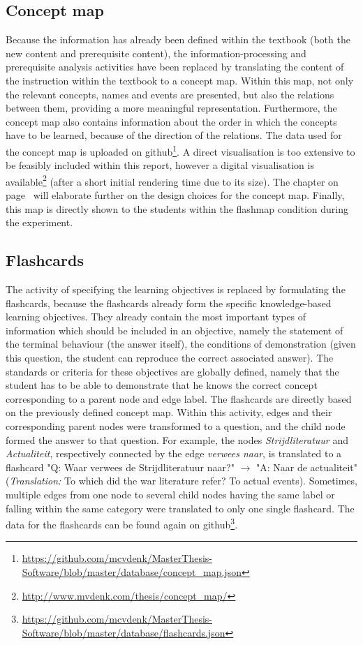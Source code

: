 \subsection{Concept map}

Because the information has already been defined within the textbook (both the new content and prerequisite content), the information-processing and prerequisite analysis activities have been replaced by translating the content of the instruction within the textbook to a concept map. Within this map, not only the relevant concepts, names and events are presented, but also the relations between them, providing a more meaningful representation. Furthermore, the concept map also contains information about the order in which the concepts have to be learned, because of the direction of the relations. The data used for the concept map is uploaded on github\footnote{\url{https://github.com/mcvdenk/MasterThesis-Software/blob/master/database/concept_map.json}}. A direct visualisation is too extensive to be feasibly included within this report, however a digital visualisation is available\footnote{\url{http://www.mvdenk.com/thesis/concept_map/}} (after a short initial rendering time due to its size). The  chapter on page~\pageref{ch:client} will elaborate further on the design choices for the concept map. Finally, this map is directly shown to the students within the flashmap condition during the experiment.

\subsection{Flashcards}

The activity of specifying the learning objectives is replaced by formulating the flashcards, because the flashcards already form the specific knowledge-based learning objectives. They already contain the most important types of information which should be included in an objective, namely the statement of the terminal behaviour (the answer itself), the conditions of demonstration (given this question, the student can reproduce the correct associated answer). The standards or criteria for these objectives are globally defined, namely that the student has to be able to demonstrate that he knows the correct concept corresponding to a parent node and edge label. The flashcards are directly based on the previously defined concept map. Within this activity, edges and their corresponding parent nodes were transformed to a question, and the child node formed the answer to that question. For example, the nodes \emph{Strijdliteratuur} and \emph{Actualiteit}, respectively connected by the edge \emph{verwees naar}, is translated to a flashcard "Q: Waar verwees de Strijdliteratuur naar?" $\rightarrow$ "A: Naar de actualiteit" (\emph{Translation:} To which did the war literature refer? To actual events). Sometimes, multiple edges from one node to several child nodes having the same label or falling within the same category were translated to only one single flashcard. The data for the flashcards can be found again on github\footnote{\url{https://github.com/mcvdenk/MasterThesis-Software/blob/master/database/flashcards.json}}.

